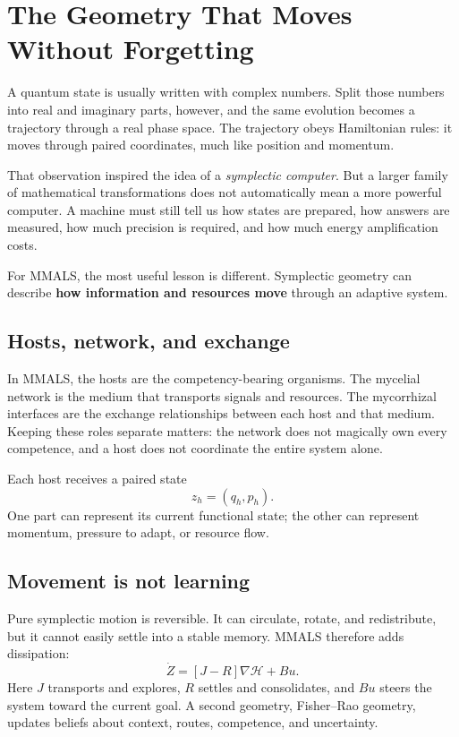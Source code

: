 \chapter{The Geometry That Moves Without Forgetting}

A quantum state is usually written with complex numbers. Split those numbers into real and imaginary parts, however, and the same evolution becomes a trajectory through a real phase space. The trajectory obeys Hamiltonian rules: it moves through paired coordinates, much like position and momentum.

That observation inspired the idea of a \emph{symplectic computer}. But a larger family of mathematical transformations does not automatically mean a more powerful computer. A machine must still tell us how states are prepared, how answers are measured, how much precision is required, and how much energy amplification costs.

For MMALS, the most useful lesson is different. Symplectic geometry can describe \textbf{how information and resources move} through an adaptive system.

\section*{Hosts, network, and exchange}
In MMALS, the hosts are the competency-bearing organisms. The mycelial network is the medium that transports signals and resources. The mycorrhizal interfaces are the exchange relationships between each host and that medium. Keeping these roles separate matters: the network does not magically own every competence, and a host does not coordinate the entire system alone.

Each host receives a paired state
\[
z_h=(q_h,p_h).
\]
One part can represent its current functional state; the other can represent momentum, pressure to adapt, or resource flow.

\section*{Movement is not learning}
Pure symplectic motion is reversible. It can circulate, rotate, and redistribute, but it cannot easily settle into a stable memory. MMALS therefore adds dissipation:
\[
\dot Z=[J-R]\nabla\mathcal H+Bu.
\]
Here $J$ transports and explores, $R$ settles and consolidates, and $Bu$ steers the system toward the current goal. A second geometry, Fisher--Rao geometry, updates beliefs about context, routes, competence, and uncertainty.

